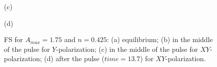 \begin{figure}[h!]
\begin{minipage}[h]{0.5\linewidth}
\end{minipage}
\begin{minipage}[h]{0.5\linewidth}
 (c) \\
\end{minipage}
\hfill
\begin{minipage}[h]{0.5\linewidth}
 (d) \\
\end{minipage}
\caption{FS for $A_{max}=1.75$ and $n=0.425$: (a) equilibrium; (b) in the middle of the pulse for $Y$-polarization; (c) in the middle of the pulse for $XY$-polarization; (d) after the pulse ($time=13.7$) for $XY$-polarization.}
\label{fig:FS_t_tp_latt}
\end{figure}

